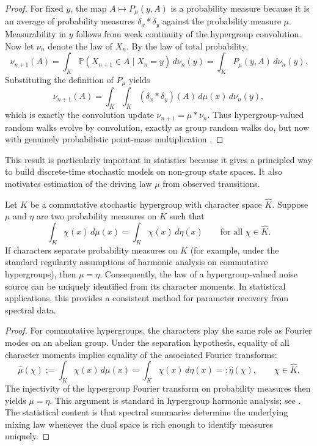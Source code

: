 \documentclass[twoside]{article}
\begin{document}
\begin{proof} 
For fixed $y$, the map $A\mapsto P_\mu(y,A)$ is a probability measure because it is an average of probability measures $\delta_x*\delta_y$ against the probability measure $\mu$. Measurability in $y$ follows from weak continuity of the hypergroup convolution. Now let $\nu_n$ denote the law of $X_n$. By the law of total probability, \[ \nu_{n+1}(A)=\int_K \mathbb{P}(X_{n+1}\in A\mid X_n=y)\, d\nu_n(y) =\int_K P_\mu(y,A)\, d\nu_n(y). \] Substituting the definition of $P_\mu$ yields \[ \nu_{n+1}(A)=\int_K \int_K (\delta_x*\delta_y)(A)\, d\mu(x)\, d\nu_n(y), \] which is exactly the convolution update $\nu_{n+1}=\mu*\nu_n$. Thus hypergroup-valued random walks evolve by convolution, exactly as group random walks do, but now with genuinely probabilistic point-mass multiplication \cite{Ross:2012}. 
\end{proof} 

\begin{rem} 
This result is particularly important in statistics because it gives a principled way to build discrete-time stochastic models on non-group state spaces. It also motivates estimation of the driving law $\mu$ from observed transitions. 
\end{rem} 


\begin{thm} \label{thm:estimation} 
Let $K$ be a commutative stochastic hypergroup with character space $\widehat K$. Suppose $\mu$ and $\eta$ are two probability measures on $K$ such that \[ \int_K \chi(x)\, d\mu(x)=\int_K \chi(x)\, d\eta(x) \qquad \text{for all } \chi\in \widehat K. \] If characters separate probability measures on $K$ (for example, under the standard regularity assumptions of harmonic analysis on commutative hypergroups), then $\mu=\eta$. Consequently, the law of a hypergroup-valued noise source can be uniquely identified from its character moments. In statistical applications, this provides a consistent method for parameter recovery from spectral data. 
\end{thm} 

\begin{proof} For commutative hypergroups, the characters play the same role as Fourier modes on an abelian group. Under the separation hypothesis, equality of all character moments implies equality of the associated Fourier transforms: \[ \widehat{\mu}(\chi):=\int_K \chi(x)\, d\mu(x)=\int_K \chi(x)\, d\eta(x)=:\widehat{\eta}(\chi), \qquad \chi\in \widehat K. \] The injectivity of the hypergroup Fourier transform on probability measures then yields $\mu=\eta$. This argument is standard in hypergroup harmonic analysis; see \cite{BloomHeyer:1995,Voit:2014}. The statistical content is that spectral summaries determine the underlying mixing law whenever the dual space is rich enough to identify measures uniquely. 
\end{proof} 
\end{document}
